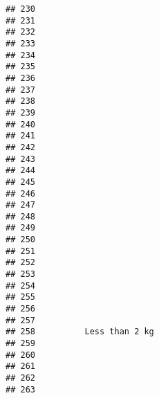 \documentclass[
]{article}
\begin{document}
\begin{verbatim}
## 230                                                                       
## 231                                                                       
## 232                                                                       
## 233                                                                       
## 234                                                                       
## 235                                                                       
## 236                                                                       
## 237                                                                       
## 238                                                                       
## 239                                                                       
## 240                                                                       
## 241                                                                       
## 242                                                                       
## 243                                                                       
## 244                                                                       
## 245                                                                       
## 246                                                                       
## 247                                                                       
## 248                                                                       
## 249                                                                       
## 250                                                                       
## 251                                                                       
## 252                                                                       
## 253                                                                       
## 254                                                                       
## 255                                                                       
## 256                                                                       
## 257                                                                       
## 258          Less than 2 kg                                               
## 259                                                                       
## 260                                                                       
## 261                                                                       
## 262                                                                       
## 263                                                                       

\end{verbatim}
\end{document}
